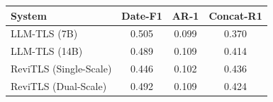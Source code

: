 \begin{tabular}{@{}lccc@{}}
\toprule
\textbf{System} & \textbf{Date-F1} & \textbf{AR-1} & \textbf{Concat-R1} \\
\midrule
LLM-TLS (7B) & 0.505 & 0.099 & 0.370 \\
LLM-TLS (14B) & 0.489 & 0.109 & 0.414 \\
ReviTLS (Single-Scale) & 0.446 & 0.102 & 0.436 \\
ReviTLS (Dual-Scale) & 0.492 & 0.109 & 0.424 \\
\bottomrule
\end{tabular}

